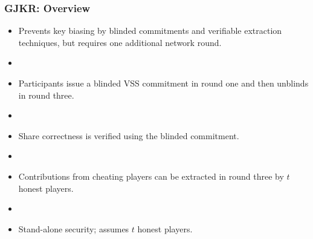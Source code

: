 \documentclass[hyperref={pdfpagelabels=true},table,dvipsnames,14pt,aspectratio=169]{beamer}
\begin{document}
\begin{frame}
  \centering
{}
\end{frame}


\begin{frame}
  \frametitle{GJKR: Overview}

  \begin{itemize}
    \item Prevents key biasing by blinded commitments and verifiable extraction techniques,
      but requires one additional network round.
    \item[]
    \item<2-> Participants issue a blinded VSS commitment in round one and then unblinds in round three.
    \item[]
    \item<3-> Share correctness is verified using the blinded commitment.
    \item[]
    \item<4-> Contributions from cheating players can be extracted in round three by $t$ honest players.
    \item[]
    \item<5-> Stand-alone security; assumes $t$ honest players.
  \end{itemize}
\end{frame}
\end{document}
